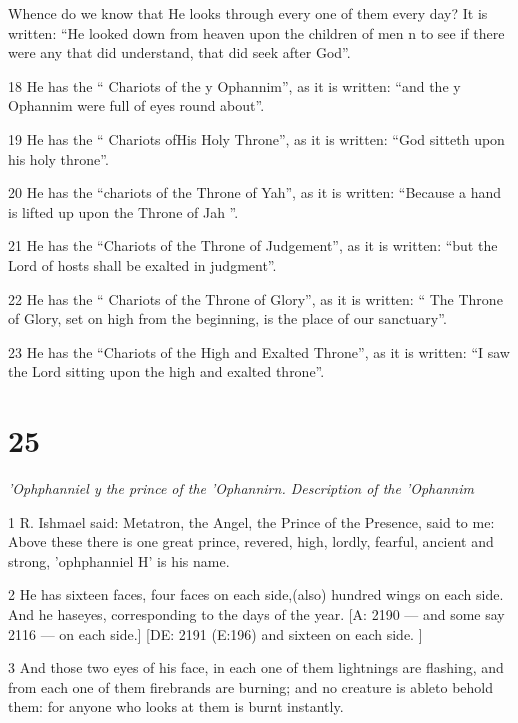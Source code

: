 \par Whence do we know that He looks through every one of them every day? It is written: “He looked down from heaven upon the children of men n to see if there were any that did understand, that did seek after God”. 

\par 18 He has the “ Chariots of the y Ophannim”, as it is written: “and the y Ophannim were full of eyes round about”.

\par 19 He has the “ Chariots ofHis Holy Throne”, as it is written: “God sitteth upon his holy throne”. 

\par 20 He has the “chariots of the Throne of Yah”, as it is written: “Because a hand is lifted up upon the Throne of Jah ”. 

\par 21 He has the “Chariots of the Throne of Judgement”, as it is written: “but the Lord of hosts shall be exalted in judgment”.

\par 22 He has the “ Chariots of the Throne of Glory”, as it is written: “ The Throne of Glory, set on high from the beginning, is the place of our sanctuary”. 

\par 23 He has the “Chariots of the High and Exalted Throne”, as it is written: “I saw the Lord sitting upon the high and exalted throne”.

\chapter{25}

\par \textit{'Ophphanniel y the prince of the 'Ophannirn. Description of the 'Ophannim}

\par 1 R. Ishmael said: Metatron, the Angel, the Prince of the Presence, said to me: Above these there is one great prince, revered, high, lordly, fearful, ancient and strong, 'ophphanniel H' is his name.

\par 2 He has sixteen faces, four faces on each side,(also) hundred wings on each side. And he haseyes, corresponding to the days of the year. [A: 2190 — and some say 2116 — on each side.] [DE: 2191 (E:196) and sixteen on each side. ]

\par 3 And those two eyes of his face, in each one of them lightnings are flashing, and from each one of them firebrands are burning; and no creature is ableto behold them: for anyone who looks at them is burnt instantly. 

